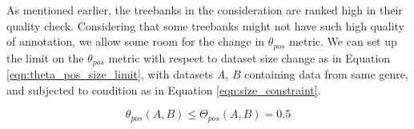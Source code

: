 As mentioned earlier, the treebanks in the consideration are ranked high in their quality check. Considering that some treebanks might not have such high quality of annotation, we allow some room for the change in $\theta_{pos}$ metric. We can set up the limit on the $\theta_{pos}$ metric with respect to dataset size change as in Equation \ref{eqn:theta_pos_size_limit}, with datasets $A$, $B$ containing data from same genre, and subjected to condition as in Equation \ref{eqn:size_constraint}.

\begin{equation}
    \boxed{\theta_{pos}(A,B) \leq \Theta_{pos}(A,B) = 0.5}
\label{eqn:theta_pos_size_limit}
\end{equation}

\newpage